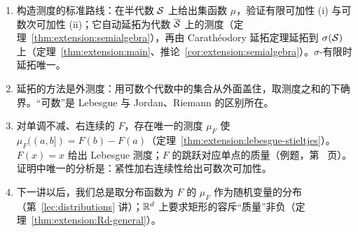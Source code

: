 \begin{enumerate}
\item 构造测度的标准路线：在半代数 $\mathcal{S}$ 上给出集函数 $\mu$，验证有限可加性 (i) 与可数次可加性 (ii)；它自动延拓为代数 $\overline{\mathcal{S}}$ 上的测度（定理~\ref{thm:extension:semialgebra}），再由 Carathéodory 延拓定理延拓到 $\sigma(\mathcal{S})$ 上（定理~\ref{thm:extension:main}、推论~\ref{cor:extension:semialgebra}）。$\sigma$-有限时延拓唯一。
\item 延拓的方法是外测度：用可数个代数中的集合从外面盖住，取测度之和的下确界。“可数”是 Lebesgue 与 Jordan、Riemann 的区别所在。
\item 对单调不减、右连续的 $F$，存在唯一的测度 $\mu_F$ 使 $\mu_F((a,b])=F(b)-F(a)$（定理~\ref{thm:extension:lebesgue-stieltjes}）。$F(x)=x$ 给出 Lebesgue 测度；$F$ 的跳跃对应单点的质量（例题，第~\pageref{we:extension:atoms} 页）。证明中唯一的分析是：紧性加右连续性给出可数次可加性。
\item 下一讲以后，我们总是取分布函数为 $F$ 的 $\mu_F$ 作为随机变量的分布（第~\ref{lec:distributions} 讲）；$\mathbb{R}^d$ 上要求矩形的容斥“质量”非负（定理~\ref{thm:extension:Rd-general}）。
\end{enumerate}

\label{hw:extension}


